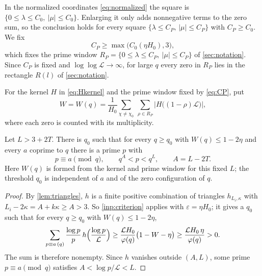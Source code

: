 \documentclass[11pt]{amsart}
\numberwithin{equation}{section}
\theoremstyle{plain}
\theoremstyle{definition}
\theoremstyle{remark}
\newcommand{\LL}{\mathcal{L}}
\newcommand{\eps}{\varepsilon}
\newcommand{\1}{\mathbf{1}}
\begin{document}
In the normalized coordinates \eqref{eq:normalized} the square is
$\{0\le\lambda\le C_0,\ |\mu|\le C_0\}$. Enlarging it only adds nonnegative terms to the zero
sum, so the conclusion holds for every square $\{\lambda\le C_P,\,|\mu|\le C_P\}$ with $C_P\ge
C_0$. We fix
\begin{equation}\label{eq:CP}
  C_P\ge\max\bigl(C_0(\eta H_0),3\bigr),
\end{equation}
which fixes the prime window $R_P=\{0\le\lambda\le C_P,\ |\mu|\le C_P\}$ of \cref{sec:notation}. Since $C_P$ is fixed and
$\log\log\LL\to\infty$, for large $q$ every zero in $R_P$ lies in the rectangle $R(l)$ of
\cref{sec:notation}.

\begin{definition}\label{def:zerosum}
For the kernel $H$ in \eqref{eq:Hkernel} and the prime window fixed by \eqref{eq:CP}, put
\[
  W=W(q)=\frac1{H_0}\sum_{\chi\ne\chi_0}\ \sum_{\rho\in R_P}\bigl|H\bigl((1-\rho)\LL\bigr)\bigr| ,
\]
where each zero is counted with its multiplicity.
\end{definition}

\begin{proposition}\label{prop:detect}
Let $L>3+2T$. There is $q_0$ such that for every $q\ge q_0$ with $W(q)\le1-2\eta$ and every $a$ coprime
to $q$ there is a prime $p$ with
\[
  p\equiv a\pmod q,\qquad q^{A}<p<q^{L},\qquad A=L-2T.
\]
Here $W(q)$ is formed from the kernel and prime window for this fixed $L$; the threshold
$q_0$ is independent of $a$ and of the zero configuration of $q$.
\end{proposition}

\begin{proof}
By \cref{lem:triangles}, $h$ is a finite positive combination of triangles $h_{L_i,\kappa}$ with
$L_i-2\kappa=A+k\kappa\ge A>3$. So \cref{inp:criterion} applies with $\eps=\eta H_0$; it
gives a $q_0$ such that for every $q\ge q_0$ with $W(q)\le1-2\eta$,
\[
  \sum_{p\equiv a\,(q)}\frac{\log p}{p}\,h\Bigl(\frac{\log p}{\LL}\Bigr)\ge
  \frac{\LL H_0}{\varphi(q)}\bigl(1-W-\eta\bigr)\ge\frac{\LL H_0\,\eta}{\varphi(q)}>0 .
\]
The sum is therefore nonempty. Since $h$ vanishes outside $(A,L)$, some prime $p\equiv a\pmod q$
satisfies $A<\log p/\LL<L$.
\end{proof}
\end{document}
